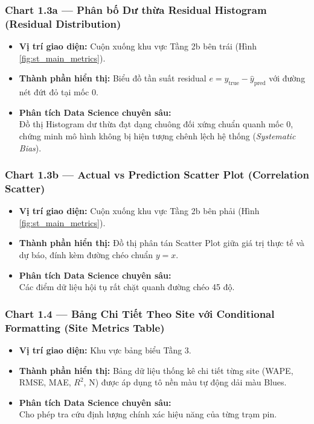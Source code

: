 \documentclass[12pt,a4paper]{article}
\begin{document}
\subsubsection{Chart 1.3a — Phân bố Dư thừa Residual Histogram (Residual Distribution)}
\begin{itemize}
    \item \textbf{Vị trí giao diện:} Cuộn xuống khu vực Tầng 2b bên trái (Hình \ref{fig:st_main_metrics}).
    \item \textbf{Thành phần hiển thị:} Biểu đồ tần suất residual $e = y_{\text{true}} - \hat{y}_{\text{pred}}$ với đường nét đứt đỏ tại mốc 0.
    \item \textbf{Phân tích Data Science chuyên sâu:}\\ 
    Đồ thị Histogram dư thừa đạt dạng chuông đối xứng chuẩn quanh mốc 0, chứng minh mô hình không bị hiện tượng chênh lệch hệ thống (\textit{Systematic Bias}).
\end{itemize}

\subsubsection{Chart 1.3b — Actual vs Prediction Scatter Plot (Correlation Scatter)}
\begin{itemize}
    \item \textbf{Vị trí giao diện:} Cuộn xuống khu vực Tầng 2b bên phải (Hình \ref{fig:st_main_metrics}).
    \item \textbf{Thành phần hiển thị:} Đồ thị phân tán Scatter Plot giữa giá trị thực tế và dự báo, đính kèm đường chéo chuẩn $y=x$.
    \item \textbf{Phân tích Data Science chuyên sâu:}\\ 
    Các điểm dữ liệu hội tụ rất chặt quanh đường chéo 45 độ.
\end{itemize}

\subsubsection{Chart 1.4 — Bảng Chi Tiết Theo Site với Conditional Formatting (Site Metrics Table)}
\begin{itemize}
    \item \textbf{Vị trí giao diện:} Khu vực bảng biểu Tầng 3.
    \item \textbf{Thành phần hiển thị:} Bảng dữ liệu thống kê chi tiết từng site (WAPE, RMSE, MAE, $R^2$, N) được áp dụng tô nền màu tự động dải màu Blues.
    \item \textbf{Phân tích Data Science chuyên sâu:}\\ 
    Cho phép tra cứu định lượng chính xác hiệu năng của từng trạm pin.
\end{itemize}
\end{document}
